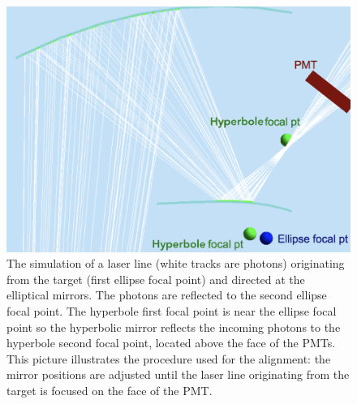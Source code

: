 \begin{figure}
\centering
	\includegraphics[width=0.99\columnwidth,  height=0.75\columnwidth]{img/mirrorAlignmentSimulationZoomed.png}
	\caption{The simulation of a laser line (white tracks are photons) originating from the target (first ellipse focal point) and directed at the elliptical mirrors.
             The photons are reflected to the second ellipse focal point. The hyperbole first focal point is near the ellipse focal point so the hyperbolic mirror
			 reflects the incoming photons to the hyperbole second focal point, located above the face of the PMTs.
			 This picture illustrates the procedure used for the alignment: the mirror positions are adjusted until the laser line originating from
			 the target is focused on the face of the PMT.}
	\label{fig:alignmentSimulation}
\end{figure}



